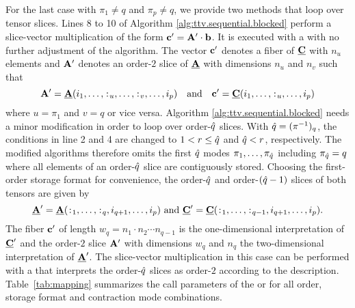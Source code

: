 For the last case with $\pi_1\neq q$ and $\pi_p \neq q$, we provide two methods that loop over tensor slices.
Lines 8 to 10 of Algorithm \ref{alg:ttv.sequential.blocked} perform a slice-vector multiplication of the form $\mathbf{c}' = \mathbf{A}' \cdot \mathbf{b}$.
It is executed with a  with no further adjustment of the algorithm.
The vector $\mathbf{c}'$ denotes a fiber of $\underline{\mathbf{C}}$ with $n_u$ elements and $\mathbf{A}'$ denotes an order-$2$ slice of $\underline{\mathbf{A}}$ with dimensions $n_u$ and $n_v$ such that
\begin{equation}
\label{equ:order.2.slice}
\mathbf{A}' = \underline{\mathbf{A}}(i_1,\dots,\colon_{\mkern-5.5muu},\dots,\colon_{\mkern-5.5muv},\dots,i_p) 
\quad \text{and} \quad
\mathbf{c}' = \underline{\mathbf{C}}(i_1,\dots,\colon_{\mkern-5.5muu},\dots,i_p)
\end{equation}
where $u=\pi_1$ and $v = q$ or vice versa.
Algorithm \ref{alg:ttv.sequential.blocked} needs a minor modification in order to loop over order-$\hat{q}$ slices. 
With $\hat{q} = (\pi^{-1})_q$, the conditions in line 2 and 4 are changed to $1 < r \leq \hat{q}$ and $\hat{q} < r$, respectively.
The modified algorithms therefore omits the first $\hat{q}$ modes $\pi_1, \dots, \pi_{\hat{q}}$ including $\pi_{\hat{q}} = q$ where all elements of an order-$\hat{q}$ slice are contiguously stored.
Choosing the first-order storage format for convenience, the order-$\hat{q}$ and order-$(\hat{q}-1)$ slices of both tensors are given by 
\begin{equation}
\label{equ:order.mhq.slice}
\underline{\mathbf{A}}' = \underline{\mathbf{A}}(\colon_{\mkern-5.5mu1},\dots,\colon_{\mkern-5.5muq},i_{q+1},\dots,i_{p}) 
\ \text{and} \
\underline{\mathbf{C}}' = \underline{\mathbf{C}}(\colon_{\mkern-5.5mu1},\dots,\colon_{\mkern-5.5mu{q-1}},i_{q+1},\dots,i_p).
\end{equation}
The fiber $\mathbf{c}'$ of length $w_q = n_{1} \cdot n_2 \cdots n_{q-1}$ is the one-dimensional interpretation of $\underline{\mathbf{C}}'$ and the order-$2$ slice $\mathbf{A}'$ with dimensions $w_q$ and $n_q$ the two-dimensional interpretation of $\underline{\mathbf{A}}'$.
The slice-vector multiplication in this case can be performed with a  that interprets the order-$\hat{q}$ slices as order-$2$ according to the description.
Table~\ref{tab:mapping} summarizes the call parameters of the \tf{DOT} or \tf{GEMV} for all order, storage format and contraction mode combinations.

